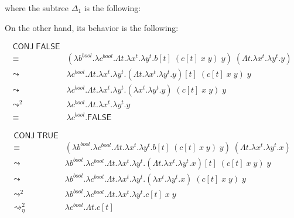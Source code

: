 \documentclass{article}
\begin{document}
where the subtree $\Delta_1$ is the following:

\begin{mathpar}
\end{mathpar}

On the other hand, its behavior is the following:

\begin{align*}
  \mathsf{CONJ}\;\mathsf{FALSE} & \\
    \equiv&
      (\lambda b^\textit{bool}.
      \lambda c^\textit{bool}.
      \Lambda t.
      \lambda x^t.
      \lambda y^t.
      b[t]\;(c[t]\;x\;y)\;y)\;
      (\Lambda t. \lambda x^t.\lambda y^t.y) \\
    \leadsto&
      \lambda c^\textit{bool}.
      \Lambda t.
      \lambda x^t.
      \lambda y^t.
      (\Lambda t. \lambda x^t.\lambda y^t.y)[t]\;(c[t]\;x\;y)\;y \\
    \leadsto&
      \lambda c^\textit{bool}.
      \Lambda t.
      \lambda x^t.
      \lambda y^t.
      (\lambda x^t.\lambda y^t.y)\;(c[t]\;x\;y)\;y \\
    \leadsto^{2}&
      \lambda c^\textit{bool}.
      \Lambda t.
      \lambda x^t.
      \lambda y^t.
      y \\
    \equiv&
      \lambda c^\textit{bool}.\mathsf{FALSE}
\end{align*}

\begin{align*}
  \mathsf{CONJ}\;\mathsf{TRUE} & \\
    \equiv&
      (\lambda b^\textit{bool}.
      \lambda c^\textit{bool}.
      \Lambda t.
      \lambda x^t.
      \lambda y^t.
      b[t]\;(c[t]\;x\;y)\;y)\;
      (\Lambda t. \lambda x^t.\lambda y^t.x) \\
    \leadsto&
      \lambda b^\textit{bool}.
      \lambda c^\textit{bool}.
      \Lambda t.
      \lambda x^t.
      \lambda y^t.
      (\Lambda t. \lambda x^t.\lambda y^t.x)[t]\;(c[t]\;x\;y)\;y \\
    \leadsto&
      \lambda b^\textit{bool}.
      \lambda c^\textit{bool}.
      \Lambda t.
      \lambda x^t.
      \lambda y^t.
      (\lambda x^t.\lambda y^t.x)\;(c[t]\;x\;y)\;y \\
    \leadsto^{2}&
      \lambda b^\textit{bool}.
      \lambda c^\textit{bool}.
      \Lambda t.
      \lambda x^t.
      \lambda y^t.
      c[t]\;x\;y \\
    \rightsquigarrow_\eta^2&
      \lambda c^\textit{bool}.
      \Lambda t. c[t]
\end{align*}
\end{document}
